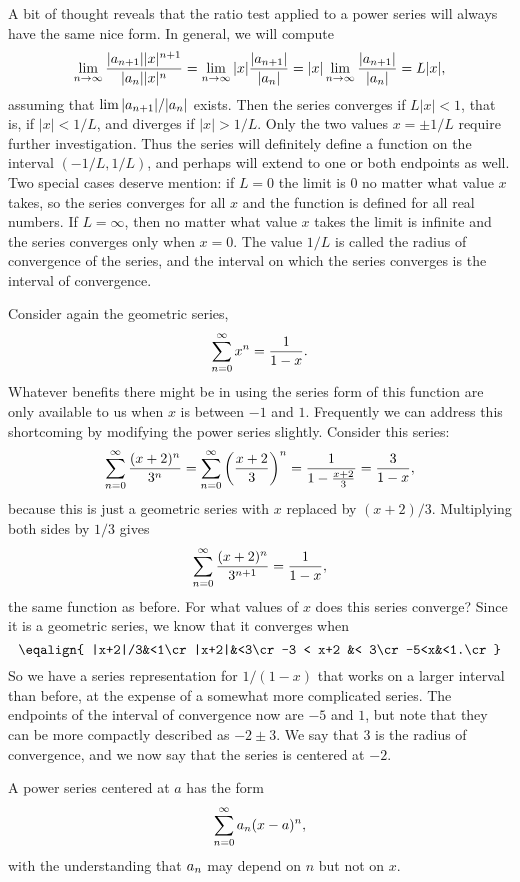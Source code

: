 A bit of thought reveals that the ratio test applied to a power series
will always have the same nice form. In general, we will compute
$$
  \lim_{n\to\infty} {|a_{n+1}||x|^{n+1}\over |a_n||x|^n}
  =\lim_{n\to\infty} |x|{|a_{n+1}|\over |a_n|} =
  |x|\lim_{n\to\infty} {|a_{n+1}|\over |a_n|} =L|x|,
$$
assuming that $\displaystyle \lim |a_{n+1}|/|a_n|$ exists. Then the series
converges if $L|x|<1$, that is, if $|x|<1/L$, and diverges if
$|x|>1/L$. Only the two values $x=\pm1/L$ require further
investigation. Thus the series will definitely define a function on
the interval $(-1/L,1/L)$, and perhaps will extend to one or both
endpoints as well. Two special cases deserve mention: if $L=0$ the
limit is $0$ no matter what value $x$ takes, so the series converges
for all $x$ and the function is defined for all real numbers. If
$L=\infty$, then no matter what value $x$ takes the limit is infinite
and the series converges only when $x=0$. The value $1/L$ is called
the {\dfont radius of convergence%
\/} of the series, and the
interval on which the series converges is the {\dfont interval of
convergence}.

Consider again the geometric series,
$$\sum_{n=0}^\infty x^n={1\over 1-x}.$$
Whatever benefits there might be in using the series form of this
function are only available to us when $x$ is between $-1$ and
$1$. Frequently we can address this shortcoming by modifying the power
series slightly. Consider this series:
$$
  \sum_{n=0}^\infty {(x+2)^n\over 3^n}=
  \sum_{n=0}^\infty \left({x+2\over 3}\right)^n={1\over 1-{x+2\over 3}}=
  {3\over 1-x},
$$
because this is just a geometric series with $x$ replaced by
$(x+2)/3$. Multiplying both sides by $1/3$ 
gives
$$\sum_{n=0}^\infty {(x+2)^n\over 3^{n+1}}={1\over 1-x},$$
the same function as before. For what values of $x$ does this series
converge? Since it is a geometric series, we know that it converges
when 
$$\eqalign{
  |x+2|/3&<1\cr
  |x+2|&<3\cr
  -3 < x+2 &< 3\cr
  -5<x&<1.\cr
}$$
So we have a series representation for $1/(1-x)$ that works on a
larger interval than before, at the expense of a somewhat more
complicated series. The endpoints of the interval of convergence now
are $-5$ and $1$, but note that they can be more compactly described
as $-2\pm3$. We say that $3$ is the radius of convergence, and
we now say that the series is centered at $-2$.

 A power series centered at $a$ has the form
$$\displaystyle\sum_{n=0}^\infty a_n(x-a)^n,$$ 
with the understanding that $\displaystyle a_n$ may depend on $n$ but not on
$x$.
\enddef


